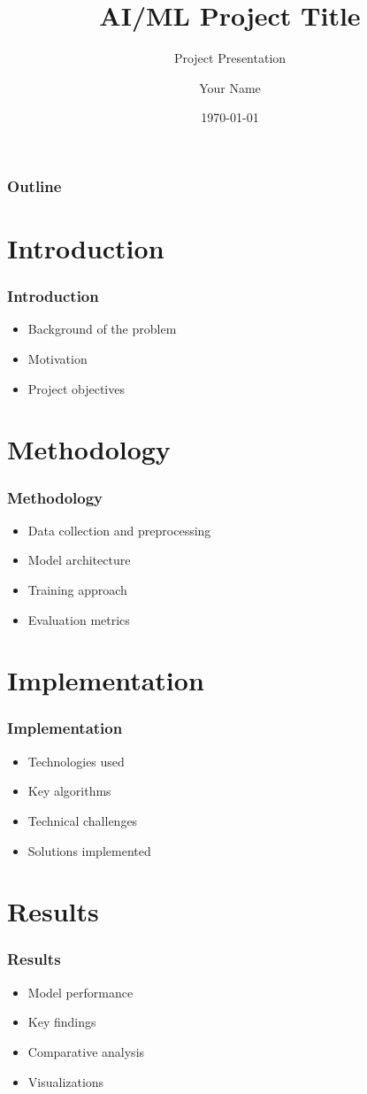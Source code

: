 \documentclass{beamer}
\title{AI/ML Project Title}
\subtitle{Project Presentation}
\author{Your Name}
\institute{Your Institution}
\date{\today}
\begin{document}
\frame{\titlepage}

\begin{frame}
\frametitle{Outline}
\tableofcontents
\end{frame}

\section{Introduction}
\begin{frame}
\frametitle{Introduction}
\begin{itemize}
    \item Background of the problem
    \item Motivation
    \item Project objectives
\end{itemize}
\end{frame}

\section{Methodology}
\begin{frame}
\frametitle{Methodology}
\begin{itemize}
    \item Data collection and preprocessing
    \item Model architecture
    \item Training approach
    \item Evaluation metrics
\end{itemize}
\end{frame}

\section{Implementation}
\begin{frame}
\frametitle{Implementation}
\begin{itemize}
    \item Technologies used
    \item Key algorithms
    \item Technical challenges
    \item Solutions implemented
\end{itemize}
\end{frame}

\section{Results}
\begin{frame}
\frametitle{Results}
\begin{itemize}
    \item Model performance
    \item Key findings
    \item Comparative analysis
    \item Visualizations
\end{itemize}
\end{frame}
\end{document}
